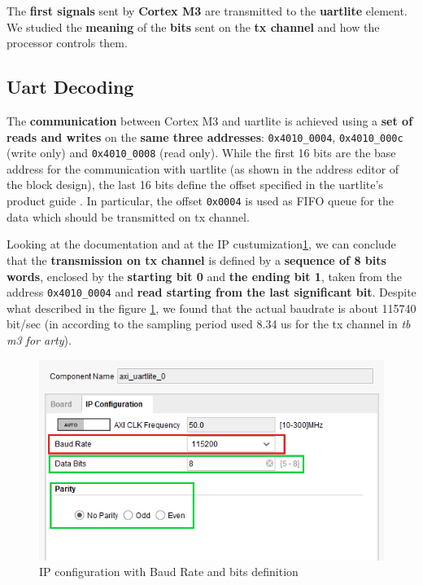 
The {\bf first signals} sent by {\bf Cortex M3} are transmitted to the {\bf uartlite} element. We studied the {\bf meaning} of the {\bf bits} sent on the {\bf tx channel} and how the processor controls them.
\newline
{\color{Blue}\subsection{Uart Decoding}}

The {\bf communication} between Cortex M3 and uartlite is achieved using a {\bf set of reads and writes} on the {\bf same three addresses}: \verb+0x4010_0004+, \verb+0x4010_000c+ (write only) and \verb+0x4010_0008+ (read only).
While the first 16 bits are the base address for the communication with uartlite (as shown in the address editor of the block design), the last 16 bits define the offset specified in the uartlite's product guide \cite[Chapter2.Register Space]{AXIUartguide}. In particular, the offset \verb+0x0004+ is used as FIFO queue for the data which should be transmitted on tx channel.
\newline

Looking at the documentation\cite{UartBasics} and at the IP custumization\ref{ip_config}, we can conclude that the {\bf transmission on tx channel} is defined by a {\bf sequence of 8 bits words}, enclosed by the {\bf starting bit 0} and {\bf the ending bit 1}, taken from the address \verb+0x4010_0004+ and {\bf read starting from the last significant bit}. Despite what described in the figure \ref{ip_config}, we found that the actual baudrate is about 115740 bit/sec (in according to the sampling period used 8.34 us for the tx channel in \textit{tb m3 for arty}).

\begin{figure}[hb]
  \includegraphics{./../../img/Images/uartlite_ip_configuration_col}
  \caption{IP configuration with {\color{Red}Baud Rate} and {\color{Green} bits} definition}
  \label{ip_config}
\end{figure}

